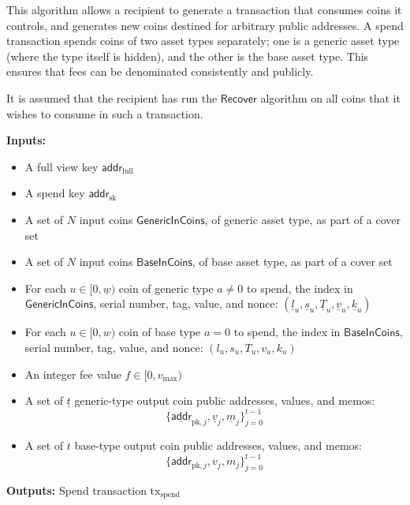 \documentclass{article}
\newcommand{\func}[1]{\mathsf{#1}}
\newcommand{\addr}{\func{addr}}
\begin{document}
This algorithm allows a recipient to generate a transaction that consumes coins it controls, and generates new coins destined for arbitrary public addresses.
A spend transaction spends coins of two asset types separately; one is a generic asset type (where the type itself is hidden), and the other is the base asset type.
This ensures that fees can be denominated consistently and publicly.

It is assumed that the recipient has run the $\func{Recover}$ algorithm on all coins that it wishes to consume in such a transaction.

\textbf{Inputs:}
\begin{itemize}
    \item A full view key $\addr_{\text{full}}$
    \item A spend key $\addr_{\text{sk}}$
    \item A set of $N$ input coins $\func{GenericInCoins}$, of generic asset type, as part of a cover set
    \item A set of $N$ input coins $\func{BaseInCoins}$, of base asset type, as part of a cover set
    \item For each $u \in [0,\underline{w})$ coin of generic type $a \neq 0$ to spend, the index in $\func{GenericInCoins}$, serial number, tag, value, and nonce: $(\underline{l}_u, \underline{s}_u, \underline{T}_u, \underline{v}_u, \underline{k}_u)$
    \item For each $u \in [0,w)$ coin of base type $a = 0$ to spend, the index in $\func{BaseInCoins}$, serial number, tag, value, and nonce: $(l_u, s_u, T_u, v_u, k_u)$
    \item An integer fee value $f \in [0,v_{\text{max}})$
    \item A set of $\underline{t}$ generic-type output coin public addresses, values, and memos: $$\{\underline{\addr}_{\text{pk},j}, \underline{v}_j, \underline{m}_j\}_{j=0}^{t-1}$$
    \item A set of $t$ base-type output coin public addresses, values, and memos: $$\{\addr_{\text{pk},j}, v_j, m_j\}_{j=0}^{t-1}$$
\end{itemize}

\textbf{Outputs:} Spend transaction $\text{tx}_{\text{spend}}$
\end{document}
